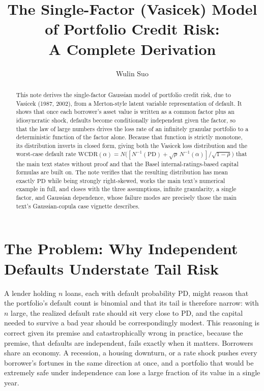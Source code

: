\documentclass[11pt]{article}
\title{The Single-Factor (Vasicek) Model of Portfolio Credit Risk:\\ A Complete Derivation}
\author{Wulin Suo}
\date{}
\theoremstyle{remark}
\theoremstyle{definition}
\begin{document}
\maketitle

\begin{abstract}
\noindent This note derives the single-factor Gaussian model of portfolio credit risk, due to Vasicek (1987, 2002), from a Merton-style latent variable representation of default. It shows that once each borrower's asset value is written as a common factor plus an idiosyncratic shock, defaults become conditionally independent given the factor, so that the law of large numbers drives the loss rate of an infinitely granular portfolio to a deterministic function of the factor alone. Because that function is strictly monotone, its distribution inverts in closed form, giving both the Vasicek loss distribution and the worst-case default rate $\text{WCDR}(\alpha)=N\!\big([N^{-1}(\text{PD})+\sqrt{\rho}\,N^{-1}(\alpha)]/\sqrt{1-\rho}\big)$ that the main text states without proof and that the Basel internal-ratings-based capital formulas are built on. The note verifies that the resulting distribution has mean exactly $\text{PD}$ while being strongly right-skewed, works the main text's numerical example in full, and closes with the three assumptions, infinite granularity, a single factor, and Gaussian dependence, whose failure modes are precisely those the main text's Gaussian-copula case vignette describes.
\end{abstract}

\section{The Problem: Why Independent Defaults Understate Tail Risk}
\label{sec:setup}

A lender holding $n$ loans, each with default probability $\text{PD}$, might reason that the portfolio's default count is binomial and that its tail is therefore narrow: with $n$ large, the realized default rate should sit very close to $\text{PD}$, and the capital needed to survive a bad year should be correspondingly modest. This reasoning is correct given its premise and catastrophically wrong in practice, because the premise, that defaults are independent, fails exactly when it matters. Borrowers share an economy. A recession, a housing downturn, or a rate shock pushes every borrower's fortunes in the same direction at once, and a portfolio that would be extremely safe under independence can lose a large fraction of its value in a single year.
\end{document}
